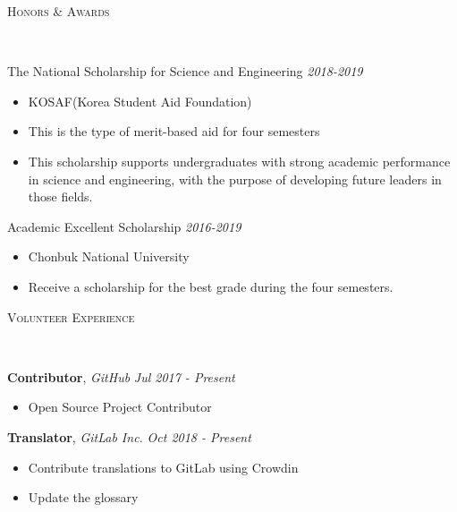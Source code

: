 \documentclass[10pt]{article}
\newenvironment{changemargin}[2]{
  \begin{list}{}{
    \setlength{\topsep}{0pt}
    \setlength{\leftmargin}{#1}
    \setlength{\rightmargin}{#2}
    \setlength{\listparindent}{\parindent}
    \setlength{\itemindent}{\parindent}
    \setlength{\parsep}{\parskip}
  }
  \item[]}{\end{list}
}
\newcommand{\lineover}{
	\begin{changemargin}{-0.05in}{-0.05in}
		\vspace*{-8pt}
		\hrulefill \\
		\vspace*{-2pt}
	\end{changemargin}
}
\newcommand{\header}[1]{
	\begin{changemargin}{-0.5in}{-0.5in}
		\scshape{#1}\\
  	\lineover
	\end{changemargin}
}
\newcommand{\labdescription}[1]{
	\begin{changemargin}{0.15in}{0.15in}
    \smallskip
		{#1}
    \medskip
	\end{changemargin}
}
\newcommand{\labtitle}[3]{
	\textbf{#1}, \emph{#2} \hfill \emph{#3}\\
}
\newcommand{\award}[2]{
	{#1} \hfill \emph{#2}\\ \medskip
}
\newenvironment{body} {
	\vspace*{-16pt}
	\begin{changemargin}{-0.25in}{-0.5in}
  }
	{\end{changemargin}
}
\begin{document}
\medskip


\header{Honors \& Awards}

\begin{body}
	\vspace{14pt}

\award{The National Scholarship for Science and Engineering}{2018-2019}
\begin{itemize} \itemsep -0pt  %
      \item  KOSAF(Korea Student Aid Foundation)
      \item This is the type of merit-based aid for four semesters
      \item This scholarship supports undergraduates with strong academic performance in science and engineering, with the purpose of developing future leaders in those fields.
  	\end{itemize}
	
	\award{Academic Excellent Scholarship}{2016-2019}
\begin{itemize} \itemsep -0pt  %
      \item  Chonbuk National University
      \item Receive a scholarship for the best grade during the four semesters.
  	\end{itemize}

\end{body}


\medskip

\pagebreak 


\header{Volunteer Experience}

\begin{body}
	\vspace{14pt}

  	\labtitle{Contributor}{GitHub}{Jul 2017 - Present}
  \labdescription {
  	\begin{itemize} \itemsep -0pt  %
      \item Open Source Project Contributor
  	\end{itemize}
  }
  
  	\labtitle{Translator}{GitLab Inc.}{Oct 2018 - Present}
  \labdescription {
  	\begin{itemize} \itemsep -0pt  %
      \item Contribute translations to GitLab using Crowdin
      \item Update the glossary
  	\end{itemize}
  }

\end{body}
\end{document}
